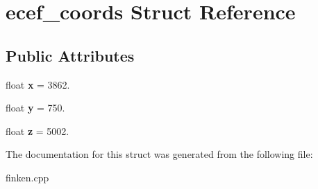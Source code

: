 \hypertarget{structecef__coords}{}\section{ecef\+\_\+coords Struct Reference}
\label{structecef__coords}
\subsection*{Public Attributes}
\begin{DoxyCompactItemize}
\item 
float {\bfseries x} = 3862.\hypertarget{structecef__coords_a8babce644114c7da9a19e637baa121d3}{}\label{structecef__coords_a8babce644114c7da9a19e637baa121d3}

\item 
float {\bfseries y} = 750.\hypertarget{structecef__coords_a1d7a58480890290b44784ebee21db0fa}{}\label{structecef__coords_a1d7a58480890290b44784ebee21db0fa}

\item 
float {\bfseries z} = 5002.\hypertarget{structecef__coords_a7c8f017506769d9e7ebe1115b62e56bb}{}\label{structecef__coords_a7c8f017506769d9e7ebe1115b62e56bb}

\end{DoxyCompactItemize}


The documentation for this struct was generated from the following file\+:\begin{DoxyCompactItemize}
\item 
finken.\+cpp\end{DoxyCompactItemize}
